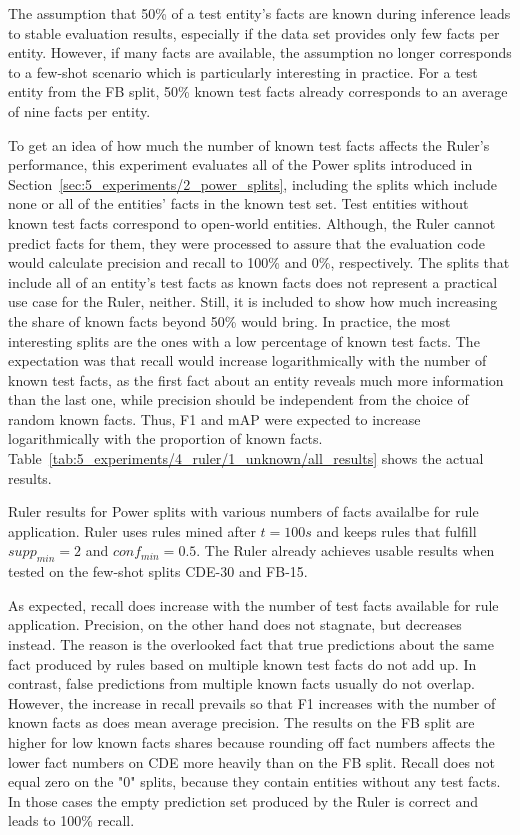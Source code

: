 The assumption that 50\% of a test entity's facts are known during inference leads to stable evaluation results, especially if the data set provides only few facts per entity. However, if many facts are available, the assumption no longer corresponds to a few-shot scenario which is particularly interesting in practice. For a test entity from the FB split, 50\% known test facts already corresponds to an average of nine facts per entity.

To get an idea of how much the number of known test facts affects the Ruler's performance, this experiment evaluates all of the Power splits introduced in Section~\ref{sec:5_experiments/2_power_splits}, including the splits which include none or all of the entities' facts in the known test set. Test entities without known test facts correspond to open-world entities. Although, the Ruler cannot predict facts for them, they were processed to assure that the evaluation code would calculate precision and recall to 100\% and 0\%, respectively. The splits that include all of an entity's test facts as known facts does not represent a practical use case for the Ruler, neither. Still, it is included to show how much increasing the share of known facts beyond 50\% would bring. In practice, the most interesting splits are the ones with a low percentage of known test facts. The expectation was that recall would increase logarithmically with the number of known test facts, as the first fact about an entity reveals much more information than the last one, while precision should be independent from the choice of random known facts. Thus, F1 and mAP were expected to increase logarithmically with the proportion of known facts. Table~\ref{tab:5_experiments/4_ruler/1_unknown/all_results} shows the actual results.

\begin{table}
    \centering
    
    \caption{Ruler results for Power splits with various numbers of facts availalbe for rule application. Ruler uses rules mined after $t = 100s$ and keeps rules that fulfill $supp_{min} = 2$ and $conf_{min} = 0.5$. The Ruler already achieves usable results when tested on the few-shot splits CDE-30 and FB-15.}
    \label{tab:5_experiments/4_ruler/1_unknown/all_results}
\end{table}

As expected, recall does increase with the number of test facts available for rule application. Precision, on the other hand does not stagnate, but decreases instead. The reason is the overlooked fact that true predictions about the same fact produced by rules based on multiple known test facts do not add up. In contrast, false predictions from multiple known facts usually do not overlap. However, the increase in recall prevails so that F1 increases with the number of known facts as does mean average precision. The results on the FB split are higher for low known facts shares because rounding off fact numbers affects the lower fact numbers on CDE more heavily than on the FB split. Recall does not equal zero on the "0" splits, because they contain entities without any test facts. In those cases the empty prediction set produced by the Ruler is correct and leads to 100\% recall.
